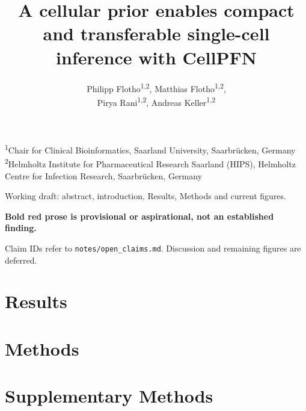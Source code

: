 \documentclass[11pt]{article}
\title{A cellular prior enables compact and transferable single-cell inference with CellPFN}
\author{Philipp Flotho\textsuperscript{1,2}, Matthias Flotho\textsuperscript{1,2},\\
Pirya Rani\textsuperscript{1,2}, Andreas Keller\textsuperscript{1,2}}
\date{}
\begin{document}
\maketitle
\begin{center}\small
\textsuperscript{1}Chair for Clinical Bioinformatics, Saarland University, Saarbr\"ucken, Germany\\
\textsuperscript{2}Helmholtz Institute for Pharmaceutical Research Saarland (HIPS), Helmholtz Centre for Infection Research, Saarbr\"ucken, Germany
\end{center}
\begin{center}\small
Working draft: abstract, introduction, Results, Methods and current figures.\par
\textcolor{red!80!black}{\textbf{Bold red prose is provisional or aspirational, not an established finding.}}\par
Claim IDs refer to \texttt{notes/open\_claims.md}. Discussion and remaining figures are deferred.
\end{center}
\begin{abstract}

\end{abstract}
\linenumbers

\section*{Results}

\clearpage


\clearpage
\section*{Methods}





\clearpage
\nolinenumbers


\clearpage

\clearpage
\section*{Supplementary Methods}
\begingroup
{}
\small
\setcounter{table}{9}
\renewcommand{\thetable}{S\arabic{table}}
\renewcommand{\theHtable}{supp.\arabic{table}}



\endgroup

\end{document}
